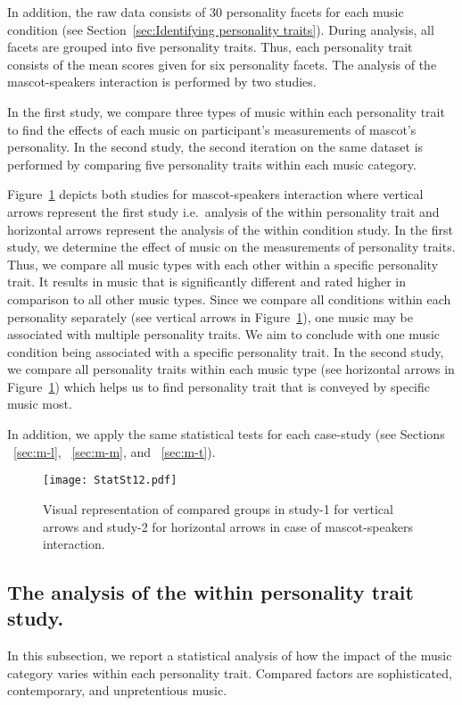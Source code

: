 In addition, the raw data consists of 30 personality facets for each music condition
(see Section~\ref{sec:Identifying personality traits}).
During analysis, all facets are grouped into five personality traits.
Thus, each personality trait consists of the mean scores given for six personality facets.
The analysis of the mascot-speakers interaction is performed by two studies.

In the first study, we compare three types of music within each personality trait
to find the effects of each music on participant's measurements of mascot's personality.
In the second study, the second iteration on the same dataset is performed by comparing five personality traits
within each music category.

Figure~\ref{fig:Stat12} depicts both studies for mascot-speakers interaction where vertical arrows represent the first study
i.e.\ analysis of the within personality trait and horizontal arrows represent the analysis of the within condition study.
In the first study, we determine the effect of music on the measurements of personality traits.
Thus, we compare all music types with each other within a specific personality trait.
It results in music that is significantly different and rated higher in comparison to all other music types.
Since we compare all conditions within each personality separately (see vertical arrows in Figure~\ref{fig:Stat12}),
one music may be associated with multiple personality traits.
We aim to conclude with one music condition being associated with a specific personality trait.
In the second study, we compare all personality traits within each music type (see horizontal
arrows in Figure~\ref{fig:Stat12}) which helps us to find personality trait that is conveyed by specific music most.

In addition, we apply the same statistical tests for each case-study
(see Sections ~\ref{sec:m-l}, ~\ref{sec:m-m}, and ~\ref{sec:m-t}).

\begin{figure}[hbt!]
    \centering
    \texttt{[image: StatSt12.pdf]}
    \caption{Visual representation of compared groups in study-1 for vertical arrows and
    study-2 for horizontal arrows in case of mascot-speakers interaction.}
    \label{fig:Stat12}
\end{figure}
\subsection{The analysis of the within personality trait study.}
\label{subsec:MSstudy1}
In this subsection, we report a statistical analysis of how the impact of the music category varies within each
personality trait.
Compared factors are sophisticated, contemporary, and unpretentious music.

